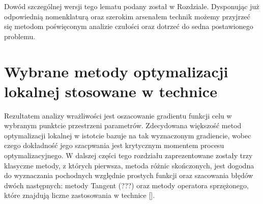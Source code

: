 \documentclass[12pt]{article}
\begin{document}
Dowód szczególnej wersji tego lematu podany został w Rozdziale. \newline
Dysponując już odpowiednią nomenklaturą oraz szerokim arsenałem technik możemy przyjrzeć się metodom poświęconym analizie czułości oraz dotrzeć do sedna postawionego problemu. 
\newpage
\section{Wybrane metody optymalizacji lokalnej stosowane w technice}
Rezultatem analizy wrażliwości jest oszacowanie gradientu funkcji celu w wybranym punktcie przestrzeni parametrów. Zdecydowana większość metod optymalizacji lokalnej w istotcie bazuje na tak wyznaczonym gradiencie, wobec czego dokładność jego szacpwania jest krytycznym momentem procesu optymalizacyjnego. W dalszej części tego rozdziału zaprezentowane zostały trzy klasyczne metody, z których pierwsza, metoda różnic skończonych, jest dogodna do wyznaczania pochodnych względnie prostych funkcji oraz szacowania błędów dwóch następnych: metody Tangent (???) oraz metody operatora sprzężonego, które znajdują liczne zastosowania w technice [].
\end{document}
